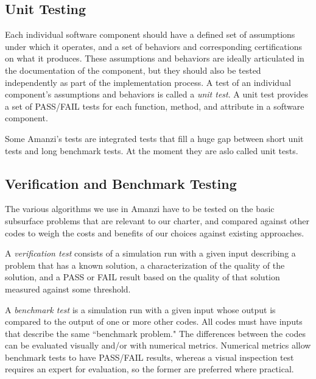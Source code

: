 

\subsection{Unit Testing}
Each individual software component should have a defined set of assumptions under 
which it operates, and a set of behaviors and corresponding certifications on 
what it produces. These assumptions and behaviors are ideally articulated in the 
documentation of the component, but they should also be tested independently as part
of the implementation process. A test of an individual component's assumptions and 
behaviors is called a {\em unit test}. A unit test provides a set of PASS/FAIL tests for 
each function, method, and attribute in a software component.

Some Amanzi's tests are integrated tests that fill a huge gap between short unit tests
and long benchmark tests.
At the moment they are aslo called unit tests. 



\subsection{Verification and Benchmark Testing}
The various algorithms we use in Amanzi have to be tested on the basic subsurface 
problems that are relevant to our charter, and compared against other codes to 
weigh the costs and benefits of our choices against existing approaches. 

A {\em verification test} consists of a simulation run with a given input describing 
a problem that has a known solution, a characterization of the quality of the 
solution, and a PASS or FAIL result based on the quality of that solution measured 
against some threshold. 


A {\em benchmark test} is a simulation run with a given input whose output is 
compared to the output of one or more other codes. All codes must have inputs that 
describe the same ``benchmark problem." The differences between the codes can be 
evaluated visually and/or with numerical metrics. Numerical metrics allow benchmark 
tests to have PASS/FAIL results, whereas a visual inspection test requires an 
expert for evaluation, so the former are preferred where practical.



